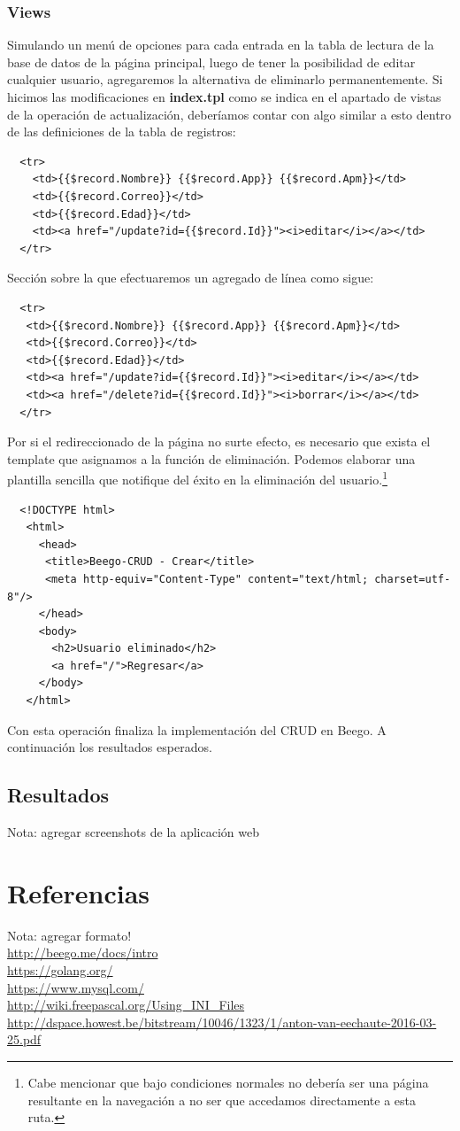 \documentclass[12pt]{article}
\begin{document}
\subsubsection{Views}
Simulando un menú de opciones para cada entrada en la tabla de lectura de la base
de datos de la página principal, luego de tener la posibilidad de editar cualquier
usuario, agregaremos la alternativa de eliminarlo permanentemente.
Si hicimos las modificaciones en \textbf{index.tpl} como se indica en el apartado de
vistas de la operación de actualización, deberíamos contar con algo similar a esto
dentro de las definiciones de la tabla de registros:
\begin{verbatim}
  <tr>
    <td>{{$record.Nombre}} {{$record.App}} {{$record.Apm}}</td>
    <td>{{$record.Correo}}</td>
    <td>{{$record.Edad}}</td>
    <td><a href="/update?id={{$record.Id}}"><i>editar</i></a></td>
  </tr>
\end{verbatim}
Sección sobre la que efectuaremos un agregado de línea como sigue:
\begin{verbatim}
  <tr>
   <td>{{$record.Nombre}} {{$record.App}} {{$record.Apm}}</td>
   <td>{{$record.Correo}}</td>
   <td>{{$record.Edad}}</td>
   <td><a href="/update?id={{$record.Id}}"><i>editar</i></a></td>
   <td><a href="/delete?id={{$record.Id}}"><i>borrar</i></a></td>
  </tr>
\end{verbatim}
Por si el redireccionado de la página no surte efecto, es necesario que
exista el template que asignamos a la función de eliminación.
Podemos elaborar una plantilla sencilla que notifique del éxito en la
eliminación del usuario.\footnote{Cabe mencionar que bajo condiciones
  normales no debería ser una página resultante en la navegación a no ser
  que accedamos directamente a esta ruta.}
\begin{verbatim}
  <!DOCTYPE html>
   <html>
     <head>
      <title>Beego-CRUD - Crear</title>
      <meta http-equiv="Content-Type" content="text/html; charset=utf-8"/>
     </head>
     <body>
       <h2>Usuario eliminado</h2>
       <a href="/">Regresar</a>
     </body>
   </html>
\end{verbatim}
Con esta operación finaliza la implementación del CRUD en Beego.
A continuación los resultados esperados.
\subsection{Resultados}
Nota: agregar screenshots de la aplicación web
\section{Referencias}
Nota: agregar formato!\\
\noindent
\url{http://beego.me/docs/intro} \\
\url{https://golang.org/}\\
\url{https://www.mysql.com/} \\
\url{http://wiki.freepascal.org/Using_INI_Files} \\
\url{http://dspace.howest.be/bitstream/10046/1323/1/anton-van-eechaute-2016-03-25.pdf}
\end{document}
